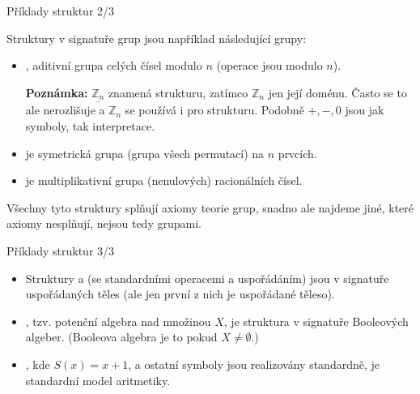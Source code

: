 \documentclass{beamer}
\begin{document}
\begin{frame}{Příklady struktur 2/3}
    
    Struktury \alert{v signatuře grup} jsou například následující \alert{grupy}: \pause 
        \begin{itemize}
            \item {}, \alert{aditivní grupa celých čísel modulo $n$} (operace jsou modulo $n$).  \pause 
            
            \smallskip
            
            \textbf{Poznámka:} $\underline{\mathbb Z_n}$ znamená strukturu, zatímco $\mathbb Z_n$ jen její doménu. Často se to ale nerozlišuje a $\mathbb Z_n$ se používá i pro strukturu. Podobně $+,-,0$ jsou jak symboly, tak interpretace. \pause 

            \smallskip

            \item {} je \alert{symetrická grupa} (grupa všech permutací) na $n$ prvcích. \pause 
            \item {} je \alert{multiplikativní grupa (nenulových) racionálních čísel}.  \pause 
        \end{itemize}
        Všechny tyto struktury \alert{splňují axiomy teorie grup}, snadno ale najdeme jiné, které axiomy nesplňují, nejsou tedy grupami.
    

\end{frame}


\begin{frame}{Příklady struktur 3/3}
    
    \begin{itemize}
        \item Struktury a (se standardními operacemi a uspořádáním) jsou \alert{v signatuře uspořádaných těles} \pause (ale jen první z nich je uspořádané těleso). \pause 
        \item {}, tzv. \alert{potenční algebra} nad množinou $X$, je struktura \alert{v signatuře Booleových algeber}. \pause (\alert{Booleova algebra} je to pokud $X\neq\emptyset$.) \pause 
        \item {}, kde $S(x)=x+1$, a ostatní symboly jsou realizovány standardně, je \alert{standardní model aritmetiky}.
    \end{itemize}

\end{frame}
\end{document}
